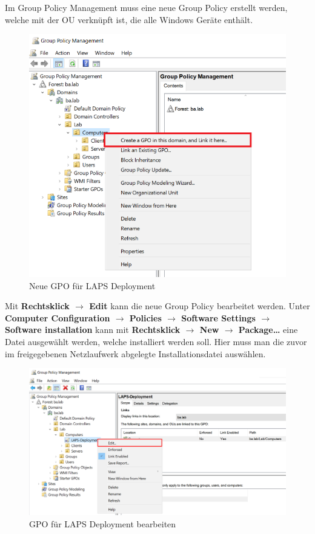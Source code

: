 Im Group Policy Management muss eine neue Group Policy erstellt werden, welche mit der OU verknüpft ist, die alle Windows Geräte enthält.
\begin{figure}[H]
    \centering
    \includegraphics[width=0.7\linewidth]{../img/LAPS/GPO-Create-New.png}
    \caption{Neue GPO für LAPS Deployment}
\end{figure}

Mit \textbf{Rechtsklick $\rightarrow$ Edit} kann die neue Group Policy bearbeitet werden.
Unter \textbf{Computer Configuration $\rightarrow$ Policies $\rightarrow$ Software Settings $\rightarrow$ Software installation} kann mit \textbf{Rechtsklick $\rightarrow$ New $\rightarrow$ Package\dots} eine Datei ausgewählt werden, welche installiert werden soll.
Hier muss man die zuvor im freigegebenen Netzlaufwerk abgelegte Installationsdatei auswählen.
\begin{figure}[H]
    \centering
    \includegraphics[width=0.7\linewidth]{../img/LAPS/GPO-Edit-Deployment.png}
    \caption{GPO für LAPS Deployment bearbeiten}
\end{figure}

